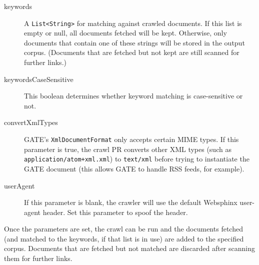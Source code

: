 \begin{description}
\item[keywords] A \texttt{List<String>} for matching against crawled
  documents.  If this list is empty or null, all documents fetched will be
  kept.  Otherwise, only documents that contain one of these strings will be
  stored in the output corpus.  (Documents that are fetched but not kept are
  still scanned for further links.)
\item[keywordsCaseSensitive] This boolean determines whether keyword matching
  is case-sensitive or not.
\item[convertXmlTypes] GATE's \texttt{XmlDocumentFormat} only accepts certain
  MIME types.  If this parameter is true, the crawl PR converts other XML
  types (such as \texttt{application/atom+xml.xml}) to \texttt{text/xml}
  before trying to instantiate the GATE document (this allows GATE to handle
  RSS feeds, for example).
\item[userAgent] If this parameter is blank, the crawler will use the default
  Websphinx user-agent header.  Set this parameter to spoof the header.
\end{description}


Once the parameters are set, the crawl can be run and the documents fetched (and
matched to the keywords, if that list is in use) are added to the specified
corpus.  Documents that are fetched but not matched are discarded after scanning
them for further links.  


